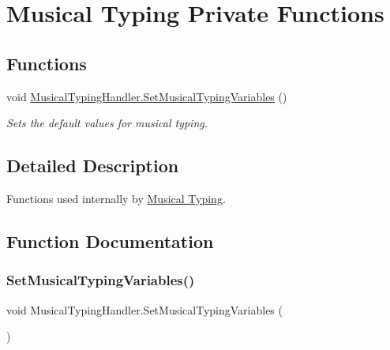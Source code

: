 \hypertarget{group___mus_typ_priv_func}{}\section{Musical Typing Private Functions}
\label{group___mus_typ_priv_func}
\subsection*{Functions}
\begin{DoxyCompactItemize}
\item 
void \hyperlink{group___mus_typ_priv_func_ga5db8ab750574dbc31279827ea5cc501e}{Musical\+Typing\+Handler.\+Set\+Musical\+Typing\+Variables} ()
\begin{DoxyCompactList}\small\item\em Sets the default values for musical typing. \end{DoxyCompactList}\end{DoxyCompactItemize}


\subsection{Detailed Description}
Functions used internally by \hyperlink{group___mus_typ}{Musical Typing}. 

\subsection{Function Documentation}
\mbox{\label{group___mus_typ_priv_func_ga5db8ab750574dbc31279827ea5cc501e}} 
\subsubsection{\texorpdfstring{Set\+Musical\+Typing\+Variables()}{SetMusicalTypingVariables()}}
{\footnotesize\ttfamily void Musical\+Typing\+Handler.\+Set\+Musical\+Typing\+Variables (\begin{DoxyParamCaption}{ }\end{DoxyParamCaption})\hspace{0.3cm}{\ttfamily [private]}}



